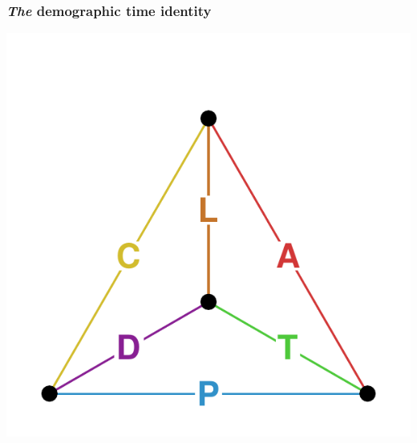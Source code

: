\documentclass[20pt]{beamer}
\begin{document}
\begin{frame}
\frametitle{\textit{The} demographic time identity}
\vspace{-4em}
\begin{center}
\includegraphics[scale=1.7]{Figures/TetraHedronEdgesOnly.pdf}
\end{center}
\end{frame}


\end{document}
